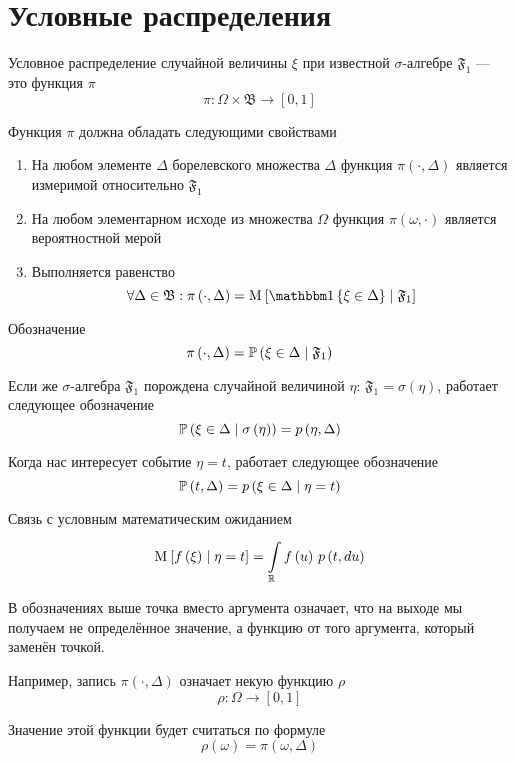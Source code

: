 \section{Условные распределения}

\begin{definition}
    Условное распределение случайной величины $\xi$
    при известной $\sigma$-алгебре $\mathfrak{F}_1$ --- это функция $\pi$
    $$\pi: \Omega \times \mathfrak{B} \rightarrow \left[ 0, 1 \right]$$
    
    Функция $\pi$ должна обладать следующими свойствами
    \begin{enumerate}
        \item На любом элементе $\Delta$ борелевского множества $\Delta$
            функция $\pi\left( \cdot, \Delta \right)$ является измеримой
            относительно $\mathfrak{F}_1$
        \item На любом элементарном исходе из множества $\Omega$
            функция $\pi\left( \omega, \cdot \right)$
            является вероятностной мерой
        \item Выполняется равенство
            $$\forall \Delta \in \mathfrak{B}: \pi\left( \cdot, \Delta \right)
                = \Mean{\Indicator{\xi \in \Delta} \mid \mathfrak{F}_1}$$
    \end{enumerate}

    Обозначение
    $$\pi\left( \cdot, \Delta \right)
        = \probability{\xi \in \Delta \mid \mathfrak{F}_1}$$

    Если же $\sigma$-алгебра $\mathfrak{F}_1$ порождена
    случайной величиной $\eta$: $\mathfrak{F}_1 = \sigma\left( \eta \right)$,
    работает следующее обозначение
    $$\probability{\xi \in \Delta \mid \sigma\left( \eta \right)}
        = \pdf{\eta, \Delta}$$

    Когда нас интересует событие $\eta = t$, работает следующее обозначение
    $$\probability{t, \Delta} = \pdf{\xi \in \Delta \mid \eta = t}$$

    Связь с условным математическим ожиданием
    $$\Mean{f\left( \xi \right) \mid \eta = t}
        = \integrall{\mathbb{R}}{\pdf{t, du}}{f\left( u \right)}$$
\end{definition}

\begin{remark}
    В обозначениях выше точка вместо аргумента означает,
    что на выходе мы получаем не определённое значение,
    а функцию от того аргумента, который заменён точкой.

    Например, запись $\pi\left( \cdot, \Delta \right)$
    означает некую функцию $\rho$
        $$\rho: \Omega \rightarrow \left[ 0, 1 \right]$$

    Значение этой функции будет считаться по формуле
        $$\rho\left( \omega \right) = \pi\left( \omega, \Delta \right)$$
\end{remark}

